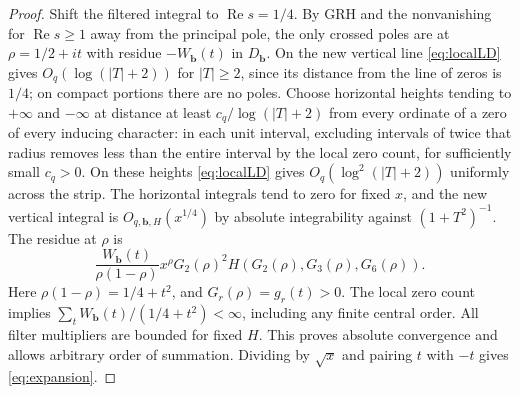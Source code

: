 \documentclass[11pt]{article}
\theoremstyle{remark}\newtheorem{remark}[theorem]{Remark}
\newcommand{\Rea}{\operatorname{Re}}\newcommand{\ord}{\operatorname{ord}}
\newcommand{\bb}{\boldsymbol b}
\begin{document}
\begin{proof}
Shift the filtered integral to $\Rea s=1/4$. By GRH and the nonvanishing for $\Rea s\ge1$ away from the principal pole, the only crossed poles are at $\rho=1/2+it$ with residue $-W_{\bb}(t)$ in $D_{\bb}$. On the new vertical line \eqref{eq:localLD} gives $O_q(\log(|T|+2))$ for $|T|\ge2$, since its distance from the line of zeros is $1/4$; on compact portions there are no poles. Choose horizontal heights tending to $+\infty$ and $-\infty$ at distance at least $c_q/\log(|T|+2)$ from every ordinate of a zero of every inducing character: in each unit interval, excluding intervals of twice that radius removes less than the entire interval by the local zero count, for sufficiently small $c_q>0$. On these heights \eqref{eq:localLD} gives $O_q(\log^2(|T|+2))$ uniformly across the strip. The horizontal integrals tend to zero for fixed $x$, and the new vertical integral is $O_{q,\bb,H}(x^{1/4})$ by absolute integrability against $(1+T^2)^{-1}$. The residue at $\rho$ is
\[
 \frac{W_{\bb}(t)}{\rho(1-\rho)} x^\rho
 G_2(\rho)^2 H(G_2(\rho),G_3(\rho),G_6(\rho)).
\]
Here $\rho(1-\rho)=1/4+t^2$, and $G_r(\rho)=g_r(t)>0$. The local zero count implies $\sum_t W_{\bb}(t)/(1/4+t^2)<\infty$, including any finite central order. All filter multipliers are bounded for fixed $H$. This proves absolute convergence and allows arbitrary order of summation. Dividing by $\sqrt x$ and pairing $t$ with $-t$ gives \eqref{eq:expansion}.
\end{proof}
\end{document}
